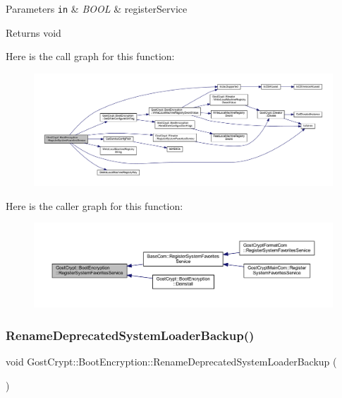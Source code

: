 \begin{DoxyParams}[1]{Parameters}
\mbox{\tt in}  & {\em B\+O\+OL} & register\+Service \\
\hline
\end{DoxyParams}
\begin{DoxyReturn}{Returns}
void 
\end{DoxyReturn}
Here is the call graph for this function\+:
\nopagebreak
\begin{figure}[H]
\begin{center}
\leavevmode
\includegraphics[width=350pt]{class_gost_crypt_1_1_boot_encryption_a7a5ba170d216844b9ff5db5b6368a0e5_cgraph}
\end{center}
\end{figure}
Here is the caller graph for this function\+:
\nopagebreak
\begin{figure}[H]
\begin{center}
\leavevmode
\includegraphics[width=350pt]{class_gost_crypt_1_1_boot_encryption_a7a5ba170d216844b9ff5db5b6368a0e5_icgraph}
\end{center}
\end{figure}
\mbox{\label{class_gost_crypt_1_1_boot_encryption_a2cf9147810cf18732e40ccbae474b7be}} 
\subsubsection{\texorpdfstring{Rename\+Deprecated\+System\+Loader\+Backup()}{RenameDeprecatedSystemLoaderBackup()}}
{\footnotesize\ttfamily void Gost\+Crypt\+::\+Boot\+Encryption\+::\+Rename\+Deprecated\+System\+Loader\+Backup (\begin{DoxyParamCaption}{ }\end{DoxyParamCaption})}



